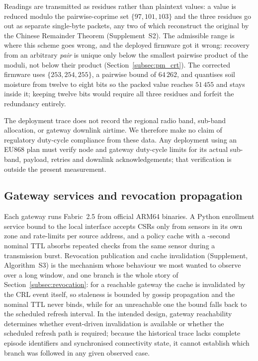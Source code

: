 \documentclass[a4paper,fleqn]{cas-sc}
\begin{document}
Readings are transmitted as residues rather than plaintext values: a value
is reduced modulo the pairwise-coprime set $\{97, 101, 103\}$ and the three
residues go out as separate single-byte packets, any two of which
reconstruct the original by the Chinese Remainder Theorem
\cite{garner1959residue} (Supplement~S2). The admissible range is where
this scheme goes wrong, and the deployed firmware got it wrong: recovery
from an arbitrary \emph{pair} is unique only below the smallest pairwise
product of the moduli, not below their product (Section~\ref{subsec:pm_crt}).
The corrected firmware uses $\{253, 254, 255\}$, a pairwise bound of
$64\,262$, and quantises soil moisture from twelve to eight bits so the
packed value reaches $51\,455$ and stays inside it; keeping twelve bits
would require all three residues and forfeit the redundancy entirely.

The deployment trace does not record the regional radio band, sub-band
allocation, or gateway downlink airtime. We therefore make no claim of
regulatory duty-cycle compliance from these data. Any deployment using an
EU868 plan must verify node and gateway duty-cycle limits for its actual
sub-band, payload, retries and downlink acknowledgements; that verification
is outside the present measurement.

\subsection{Gateway services and revocation propagation}
\label{subsec:gateway}

Each gateway runs Fabric~2.5 from official ARM64 binaries. A Python
enrollment service bound to the local interface accepts CSRs only from
sensors in its own zone and rate-limits per source address, and a policy
cache with a \RevCacheTTL-second nominal TTL absorbs repeated checks from
the same sensor during a transmission burst. Revocation publication and
cache invalidation (Supplement, Algorithm~S3) is the mechanism whose
behaviour we most wanted to observe over a long window, and one branch is
the whole story of Section~\ref{subsec:revocation}: for a reachable
gateway the cache is invalidated by the CRL event itself, so staleness is
bounded by gossip propagation and the nominal TTL never binds, while for an
unreachable one the bound falls back to the scheduled refresh interval.
In the intended design, gateway reachability determines whether
event-driven invalidation is available or whether the scheduled refresh
path is required; because the historical trace lacks complete episode
identifiers and synchronised connectivity state, it cannot establish
which branch was followed in any given observed case.
\end{document}
